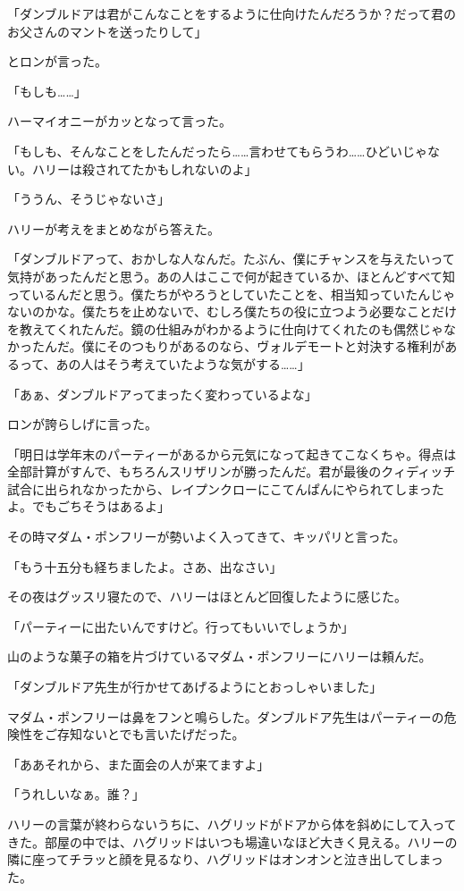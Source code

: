 \documentclass[10pt,a4paper]{article}
\begin{document}
\begin{CJK}{UTF8}{min}
「ダンブルドアは君がこんなことをするように仕向けたんだろうか？だって君のお父さんのマントを送ったりして」

とロンが言った。

「もしも……」

ハーマイオニーがカッとなって言った。

「もしも、そんなことをしたんだったら……言わせてもらうわ……ひどいじゃない。ハリーは殺されてたかもしれないのよ」

「ううん、そうじゃないさ」

ハリーが考えをまとめながら答えた。

「ダンブルドアって、おかしな人なんだ。たぶん、僕にチャンスを与えたいって気持があったんだと思う。あの人はここで何が起きているか、ほとんどすべて知っているんだと思う。僕たちがやろうとしていたことを、相当知っていたんじゃないのかな。僕たちを止めないで、むしろ僕たちの役に立つよう必要なことだけを教えてくれたんだ。鏡の仕組みがわかるように仕向けてくれたのも偶然じゃなかったんだ。僕にそのつもりがあるのなら、ヴォルデモートと対決する権利があるって、あの人はそう考えていたような気がする……」

「あぁ、ダンブルドアってまったく変わっているよな」

ロンが誇らしげに言った。

「明日は学年末のパーティーがあるから元気になって起きてこなくちゃ。得点は全部計算がすんで、もちろんスリザリンが勝ったんだ。君が最後のクィディッチ試合に出られなかったから、レイプンクローにこてんぱんにやられてしまったよ。でもごちそうはあるよ」

その時マダム・ポンフリーが勢いよく入ってきて、キッパリと言った。

「もう十五分も経ちましたよ。さあ、出なさい」



その夜はグッスリ寝たので、ハリーはほとんど回復したように感じた。

「パーティーに出たいんですけど。行ってもいいでしょうか」

山のような菓子の箱を片づけているマダム・ポンフリーにハリーは頼んだ。

「ダンブルドア先生が行かせてあげるようにとおっしゃいました」

マダム・ポンフリーは鼻をフンと鳴らした。ダンブルドア先生はパーティーの危険性をご存知ないとでも言いたげだった。

「ああそれから、また面会の人が来てますよ」

「うれしいなぁ。誰？」

ハリーの言葉が終わらないうちに、ハグリッドがドアから体を斜めにして入ってきた。部屋の中では、ハグリッドはいつも場違いなほど大きく見える。ハリーの隣に座ってチラッと顔を見るなり、ハグリッドはオンオンと泣き出してしまった。


\end{CJK}
\end{document}
